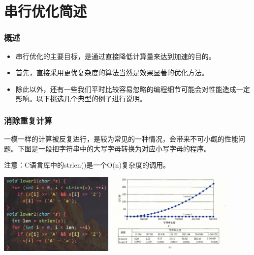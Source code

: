 \documentclass{beamer}
\begin{document}
\section{串行优化简述}

\begin{frame}
\frametitle{概述}

\begin{itemize}
    \item<1-> 串行优化的主要目标，是通过直接降低计算量来达到加速的目的。
    \item<2-> 首先，直接采用更优复杂度的算法当然是效果显著的优化方法。
    \item<3-> 除此以外，还有一些我们平时比较容易忽略的编程细节可能会对性能造成一定影响。以下挑选几个典型的例子进行说明。
\end{itemize}

\end{frame}

\begin{frame}
\frametitle{消除重复计算}
一模一样的计算被反复进行，是较为常见的一种情况，会带来不可小觑的性能问题。下图是一段把字符串中的大写字母转换为对应小写字母的程序。

注意：C语言库中的strlen()是一个O(n)复杂度的调用。

\centering\includegraphics[height=4cm]{reducecalc.png}\pause
\centering\includegraphics[height=4cm]{benchmark0.jpg}
\end{frame}
\end{document}
